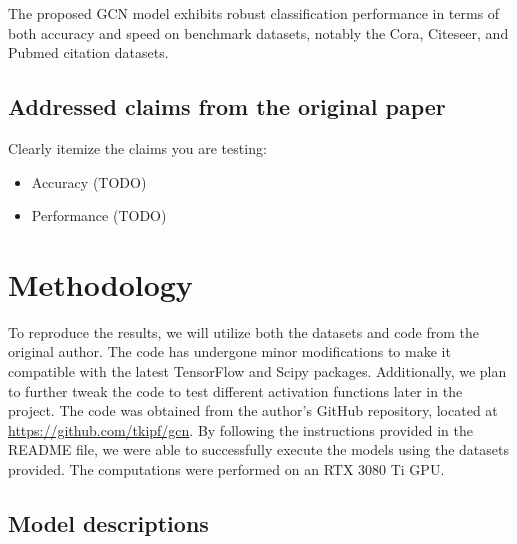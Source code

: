 \documentclass[11pt,a4paper]{article}
\begin{document}



The proposed GCN model exhibits robust classification performance in terms of both accuracy and speed on benchmark datasets, notably the Cora, Citeseer, and Pubmed citation datasets.

\subsection{Addressed claims from the original paper}

Clearly itemize the claims you are testing:
\begin{itemize}
    \item Accuracy (TODO)
    \item Performance (TODO)
\end{itemize}


\section{Methodology}


To reproduce the results, we will utilize both the datasets and code from the original author. The code has undergone minor modifications to make it compatible with the latest TensorFlow and Scipy packages. Additionally, we plan to further tweak the code to test different activation functions later in the project. The code was obtained from the author's GitHub repository, located at \url{https://github.com/tkipf/gcn}. By following the instructions provided in the README file, we were able to successfully execute the models using the datasets provided. The computations were performed on an RTX 3080 Ti GPU.

\subsection{Model descriptions}
\end{document}
